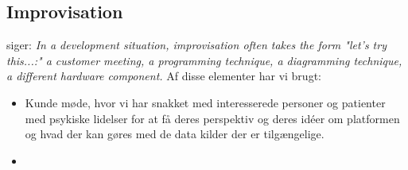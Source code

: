 \subsection{Improvisation}
\citet[side 56]{book:softwareinnovation} siger: \textit{In a development situation, improvisation often takes the form "let's try this...:" a customer meeting, a programming technique, a diagramming technique, a different hardware component.}
Af disse elementer har vi brugt: 

\begin{itemize}
	\item Kunde møde, hvor vi har snakket med interesserede personer og patienter med psykiske lidelser for at få deres perspektiv og deres idéer om platformen og hvad der kan gøres med de data kilder der er tilgængelige.
	\item 
\end{itemize} 